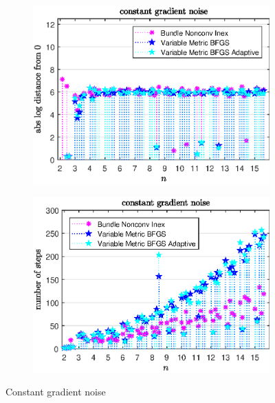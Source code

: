 \begin{figure}[H]
	\begin{subfigure}{0.49\textwidth}
		\includegraphics[width=\textwidth]{Pictures/Plots/constant_gradient_noise.eps}%
	\end{subfigure}
	\begin{subfigure}{0.49\textwidth}
		\includegraphics[width=\textwidth]{Pictures/Plots/steps_constant_gradient_noise.eps}%
	\end{subfigure}
	\caption{Constant gradient noise}%
	\label{fig_const_grad_noise}%
\end{figure}

